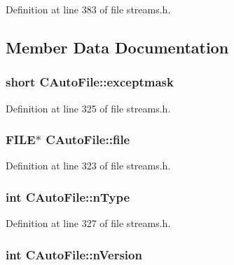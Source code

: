 Definition at line 383 of file streams.\+h.



\subsection{Member Data Documentation}
\hypertarget{class_c_auto_file_a09729c28c239d6b157adee2c3853fa23}{}
\subsubsection[{exceptmask}]{\setlength{\rightskip}{0pt plus 5cm}short C\+Auto\+File\+::exceptmask\hspace{0.3cm}{\ttfamily [protected]}}\label{class_c_auto_file_a09729c28c239d6b157adee2c3853fa23}


Definition at line 325 of file streams.\+h.

\hypertarget{class_c_auto_file_a04ae666616ebc5d873c636fe6d2998ff}{}
\subsubsection[{file}]{\setlength{\rightskip}{0pt plus 5cm}F\+I\+L\+E$\ast$ C\+Auto\+File\+::file\hspace{0.3cm}{\ttfamily [protected]}}\label{class_c_auto_file_a04ae666616ebc5d873c636fe6d2998ff}


Definition at line 323 of file streams.\+h.

\hypertarget{class_c_auto_file_a39ca705ff45e36a05acd5df3c4114aef}{}
\subsubsection[{n\+Type}]{\setlength{\rightskip}{0pt plus 5cm}int C\+Auto\+File\+::n\+Type}\label{class_c_auto_file_a39ca705ff45e36a05acd5df3c4114aef}


Definition at line 327 of file streams.\+h.

\hypertarget{class_c_auto_file_a23fb456ee23003aebc3c58ab3fd683c1}{}
\subsubsection[{n\+Version}]{\setlength{\rightskip}{0pt plus 5cm}int C\+Auto\+File\+::n\+Version}\label{class_c_auto_file_a23fb456ee23003aebc3c58ab3fd683c1}


